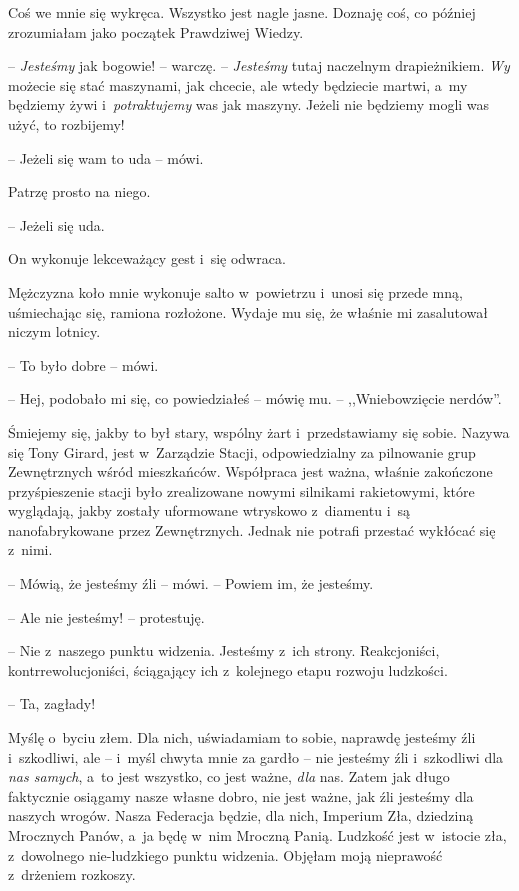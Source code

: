 \documentclass[oneside,polish,11pt,sfheadings]{mwbk}
\begin{document}
Coś we mnie się wykręca. Wszystko jest nagle jasne. Doznaję coś, co
później zrozumiałam jako początek Prawdziwej Wiedzy.

-- \textit{Jesteśmy} jak bogowie! -- warczę. -- \textit{Jesteśmy} tutaj
naczelnym drapieżnikiem. \textit{Wy} możecie się stać maszynami, jak
chcecie, ale wtedy będziecie martwi, a~my będziemy żywi i~\textit{potraktujemy} was jak maszyny. Jeżeli nie będziemy mogli was użyć,
to rozbijemy!

-- Jeżeli się wam to uda -- mówi.

Patrzę prosto na niego. 

-- Jeżeli się uda.

On wykonuje lekceważący gest i~się odwraca.

Mężczyzna koło mnie wykonuje salto w~powietrzu i~unosi się przede mną,
uśmiechając się, ramiona rozłożone. Wydaje mu się, że właśnie mi
zasalutował niczym lotnicy.

-- To było dobre -- mówi.

-- Hej, podobało mi się, co powiedziałeś -- mówię mu. -- ,,Wniebowzięcie
nerdów''.

Śmiejemy się, jakby to był stary, wspólny żart i~przedstawiamy się
sobie. Nazywa się Tony Girard, jest w~Zarządzie Stacji, odpowiedzialny
za pilnowanie grup Zewnętrznych wśród mieszkańców. Współpraca jest
ważna, właśnie zakończone przyśpieszenie stacji było zrealizowane nowymi
silnikami rakietowymi, które wyglądają, jakby zostały uformowane
wtryskowo z~diamentu i~są nanofabrykowane przez Zewnętrznych. Jednak nie
potrafi przestać wykłócać się z~nimi.

-- Mówią, że jesteśmy źli -- mówi. -- Powiem im, że jesteśmy.

-- Ale nie jesteśmy! -- protestuję.

-- Nie z~naszego punktu widzenia. Jesteśmy z~ich strony. Reakcjoniści,
kontrrewolucjoniści, ściągający ich z~kolejnego etapu rozwoju ludzkości.

-- Ta, zagłady!

Myślę o~byciu złem. Dla nich, uświadamiam to sobie, naprawdę jesteśmy
źli i~szkodliwi, ale -- i~myśl chwyta mnie za gardło -- nie jesteśmy źli i~szkodliwi dla \textit{nas samych}, a~to jest wszystko, co jest ważne,
\textit{dla }nas. Zatem jak długo faktycznie osiągamy nasze własne dobro,
nie jest ważne, jak źli jesteśmy dla naszych wrogów. Nasza Federacja
będzie, dla nich, Imperium Zła, dziedziną Mrocznych Panów, a~ja będę w~nim Mroczną Panią. Ludzkość jest w~istocie zła, z~dowolnego
nie-ludzkiego punktu widzenia. Objęłam moją nieprawość z~drżeniem
rozkoszy.
\end{document}
